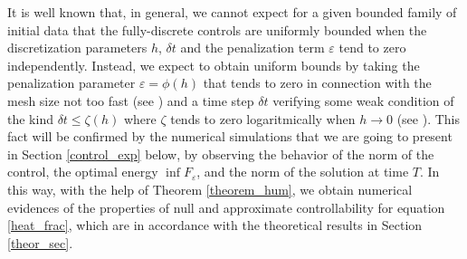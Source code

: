 It is well known that, in general, we cannot expect for a given bounded family of initial data that the fully-discrete controls are uniformly bounded when the discretization parameters $h$, $\delta t$ and the penalization term $\varepsilon$ tend to zero independently. Instead, we expect to obtain uniform bounds by taking the penalization parameter $\varepsilon=\phi(h)$ that tends to zero in connection with the mesh size not too fast (see \cite{boyer2013penalised}) and a time step $\delta t$ verifying some weak condition of the kind $\delta t\leq \zeta(h)$ where $\zeta$ tends to zero logaritmically when $h\to 0$ (see \cite{boyer2011uniform}). 
This fact will be confirmed by the numerical simulations that we are going to present in Section \ref{control_exp} below, by observing the behavior of the norm of the control, the optimal energy $\inf F_\varepsilon$, and the norm of the solution at time $T$. In this way, with the help of Theorem \ref{theorem_hum}, we obtain numerical evidences of the properties of null and approximate controllability for equation \eqref{heat_frac}, which are in accordance with the theoretical results in Section \ref{theor_sec}. 

